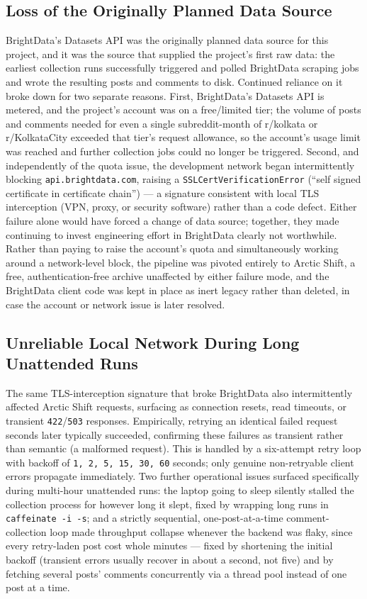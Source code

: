\documentclass[12pt]{article}
\begin{document}
\subsection{Loss of the Originally Planned Data Source}
BrightData's Datasets API was the originally planned data source for this project, and it was the
source that supplied the project's first raw data: the earliest collection runs successfully
triggered and polled BrightData scraping jobs and wrote the resulting posts and comments to disk.
Continued reliance on it broke down for two separate reasons. First, BrightData's Datasets API is
metered, and the project's account was on a free/limited tier; the volume of posts and comments
needed for even a single subreddit-month of r/kolkata or r/KolkataCity exceeded that tier's
request allowance, so the account's usage limit was reached and further collection jobs could no
longer be triggered. Second, and independently of the quota issue, the development network began
intermittently blocking \texttt{api.brightdata.com}, raising a \texttt{SSLCertVerificationError}
(``self signed certificate in certificate chain'') — a signature consistent with local TLS
interception (VPN, proxy, or security software) rather than a code defect. Either failure alone
would have forced a change of data source; together, they made continuing to invest engineering
effort in BrightData clearly not worthwhile. Rather than paying to raise the account's quota and
simultaneously working around a network-level block, the pipeline was pivoted entirely to Arctic
Shift, a free, authentication-free archive unaffected by either failure mode, and the BrightData
client code was kept in place as inert legacy rather than deleted, in case the account or network
issue is later resolved.

\subsection{Unreliable Local Network During Long Unattended Runs}
The same TLS-interception signature that broke BrightData also intermittently affected Arctic
Shift requests, surfacing as connection resets, read timeouts, or transient
\texttt{422}/\texttt{503} responses. Empirically, retrying an identical failed request seconds
later typically succeeded, confirming these failures as transient rather than semantic (a
malformed request). This is handled by a six-attempt retry loop with backoff of \texttt{1, 2, 5,
15, 30, 60} seconds; only genuine non-retryable client errors propagate immediately. Two further
operational issues surfaced specifically during multi-hour unattended runs: the laptop going to
sleep silently stalled the collection process for however long it slept, fixed by wrapping long
runs in \texttt{caffeinate -i -s}; and a strictly sequential, one-post-at-a-time comment-collection
loop made throughput collapse whenever the backend was flaky, since every retry-laden post cost
whole minutes — fixed by shortening the initial backoff (transient errors usually recover in
about a second, not five) and by fetching several posts' comments concurrently via a thread pool
instead of one post at a time.
\end{document}
